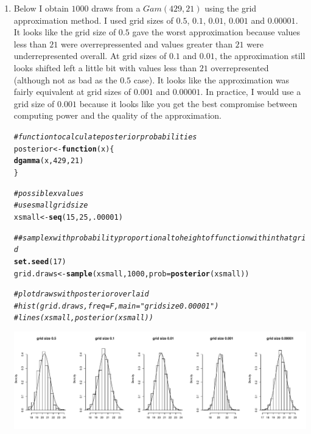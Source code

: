 \documentclass[12pt]{article}\usepackage[]{graphicx}\usepackage[]{color}
\makeatletter
\newcommand{\hlnum}[1]{\textcolor[rgb]{0.686,0.059,0.569}{#1}}%
\newcommand{\hlcom}[1]{\textcolor[rgb]{0.678,0.584,0.686}{\textit{#1}}}%
\newcommand{\hlstd}[1]{\textcolor[rgb]{0.345,0.345,0.345}{#1}}%
\newcommand{\hlkwa}[1]{\textcolor[rgb]{0.161,0.373,0.58}{\textbf{#1}}}%
\newcommand{\hlkwb}[1]{\textcolor[rgb]{0.69,0.353,0.396}{#1}}%
\newcommand{\hlkwc}[1]{\textcolor[rgb]{0.333,0.667,0.333}{#1}}%
\newcommand{\hlkwd}[1]{\textcolor[rgb]{0.737,0.353,0.396}{\textbf{#1}}}%
\newenvironment{kframe}{%
 \def\at@end@of@kframe{}%
 \ifinner\ifhmode%
  \def\at@end@of@kframe{\end{minipage}}%
  \begin{minipage}{\columnwidth}%
 \fi\fi%
 \def\FrameCommand##1{\hskip\@totalleftmargin \hskip-\fboxsep
 \colorbox{shadecolor}{##1}\hskip-\fboxsep
     \hskip-\linewidth \hskip-\@totalleftmargin \hskip\columnwidth}%
 \MakeFramed {\advance\hsize-\width
   \@totalleftmargin\z@ \linewidth\hsize
   \@setminipage}}%
 {\par\unskip\endMakeFramed%
 \at@end@of@kframe}
\newenvironment{knitrout}{}{} %
\makeatother
\begin{document}
\begin{doublespacing}
\begin{enumerate}
\item Below I obtain $1000$ draws from a $Gam(429, 21)$ using the grid approximation method. I used grid sizes of $0.5$, $0.1$, $0.01$, $0.001$ and $0.00001$. It looks like the grid size of $0.5$ gave the worst approximation because values less than $21$ were overrepressented and values greater than $21$ were underrepresented overall. At grid sizes of $0.1$ and $0.01$, the approximation still looks shifted left a little bit with values less than $21$ overrepresented (although not as bad as the $0.5$ case). It looks like the approximation was fairly equivalent at grid sizes of $0.001$ and $0.00001$. In practice, I would use a grid size of $0.001$ because it looks like you get the best compromise between computing power and the quality of the approximation.

\begin{singlespace}
\begin{knitrout}\footnotesize
{}\color{fgcolor}\begin{kframe}
\begin{alltt}
\hlcom{#function to calculate posterior probabilities}
\hlstd{posterior} \hlkwb{<-} \hlkwa{function}\hlstd{(}\hlkwc{x}\hlstd{)\{}
  \hlkwd{dgamma}\hlstd{(x,} \hlnum{429}\hlstd{,} \hlnum{21}\hlstd{)}
\hlstd{\}}

\hlcom{#possible x values}
\hlcom{#use small grid size}
\hlstd{xsmall} \hlkwb{<-} \hlkwd{seq}\hlstd{(}\hlnum{15}\hlstd{,} \hlnum{25}\hlstd{,} \hlnum{.00001}\hlstd{)}

\hlcom{##sample x with probability proportional to height of function within that grid}
\hlkwd{set.seed}\hlstd{(}\hlnum{17}\hlstd{)}
\hlstd{grid.draws} \hlkwb{<-} \hlkwd{sample}\hlstd{(xsmall,} \hlnum{1000}\hlstd{,} \hlkwc{prob}\hlstd{=}\hlkwd{posterior}\hlstd{(xsmall))}

\hlcom{#plot draws with posterior overlaid}
\hlcom{#hist(grid.draws, freq=F, main="grid size 0.00001")}
\hlcom{#lines(xsmall, posterior(xsmall))}
\end{alltt}
\end{kframe}
\end{knitrout}
\end{singlespace}

\begin{center}
\begin{knitrout}\footnotesize
{}\color{fgcolor}
\includegraphics[width=\linewidth]{figure/histograms-1} 


\end{knitrout}
\end{center}
\end{enumerate}
\end{doublespacing}
\end{document}
